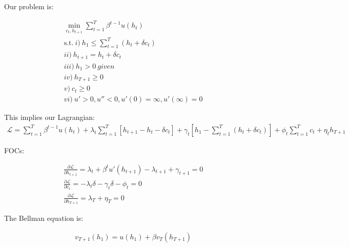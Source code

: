 \documentclass{article}[12pt]
\begin{document}
Our problem is:

\begin{equation}
\begin{aligned}
    \label{eq:max}
    \min_{c_t, h_{t+1}} \sum_{t=1}^T \beta^{t-1} u(h_t) \\
    \textrm{s.t.} \ i) \ h_1 \leq \sum_{t=1}^T(h_t + \delta c_t) \\
    ii) \ h_{t+1} = h_t + \delta c_t \\
    iii) \ h_1 > 0 \ given \\
    iv) \ h_{T+1} \geq0 \\
    v) \ c_t \geq0 \\
    vi) \ u' > 0, u'' < 0 , u'(0) = \infty, u'(\infty) = 0
\end{aligned}
\end{equation}

This implies our Lagrangian:
\begin{equation}
\begin{aligned}
    \label{eq:lagrangian}
    \mathcal{L} = \sum_{t=1}^T \beta^{t-1} u(h_t) +  \lambda_t \sum_{t=1}^T [h_{t+1} - h_t - \delta c_t] + \gamma_t[h_1 - \sum_{t=1}^T(h_t + \delta c_t)] + \phi_t \sum_{t=1}^T c_t + \eta_t h_{T+1}
\end{aligned}
\end{equation}

FOCs:

\begin{equation}
\begin{aligned}
    \label{eq:fonc}
    \frac{\partial \mathcal{L}}{\partial h_{t+1}} = \lambda_t + \beta ^t u'(h_{t+1}) - \lambda_{t+1} + \gamma_{t+1} = 0 \\
    \frac{\partial \mathcal{L}}{\partial c_t} = -\lambda_t \delta - \gamma_t \delta - \phi_t = 0 \\
    \frac{\partial \mathcal{L}}{\partial h_{T+1}} = \lambda_T + \eta_T = 0
\end{aligned}
\end{equation}

The Bellman equation is:

\begin{equation}
\begin{aligned}
    \label{eq:bellman}
    v_{T+1}(h_1) = u(h_1) + \beta v_T (h_{T+1})
\end{aligned}
\end{equation}
\end{document}
